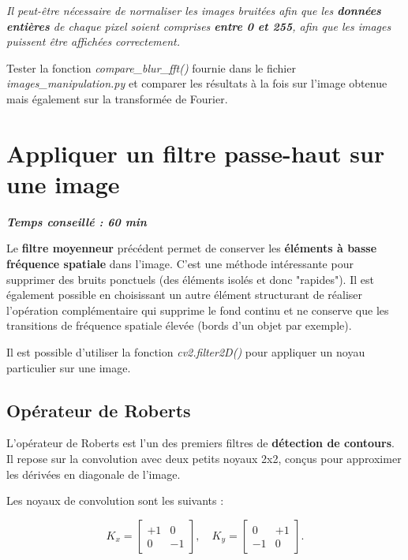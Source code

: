 \documentclass[a4paper,11pt,titlepage]{article} %
\begin{document}
\medskip

\textit{Il peut-être nécessaire de normaliser les images bruitées afin que les \textbf{données entières} de chaque pixel soient comprises \textbf{entre 0 et 255}, afin que les images puissent être affichées correctement.} 

\Manip Tester la fonction \textsl{compare\_blur\_fft()} fournie dans le fichier \textsl{images\_manipulation.py} et comparer les résultats à la fois sur l'image obtenue mais également sur la transformée de Fourier.


\section{Appliquer un filtre passe-haut sur une image}

\begin{center} \textbf{\textit{Temps conseillé : 60 min}} \end{center}

Le \textbf{filtre moyenneur} précédent permet de conserver les \textbf{éléments à basse fréquence spatiale} dans l'image. C'est une méthode intéressante pour supprimer des bruits ponctuels (des éléments isolés et donc "rapides"). Il est également possible en choisissant un autre élément structurant de réaliser l'opération complémentaire qui supprime le fond continu et ne conserve que les transitions de fréquence spatiale élevée (bords d'un objet par exemple).

\medskip

Il est possible d'utiliser la fonction \textsl{cv2.filter2D()} pour appliquer un noyau particulier sur une image.

\subsection{Opérateur de Roberts}

L'opérateur de Roberts est l'un des premiers filtres de \textbf{détection de contours}. Il repose sur la convolution avec deux petits noyaux 2x2, conçus pour approximer les dérivées en diagonale de l'image.

Les noyaux de convolution sont les suivants :

$$K_x = \begin{bmatrix}
+1 & 0 \\
0 & -1
\end{bmatrix},
\quad
K_y =
\begin{bmatrix}
0 & +1 \\
-1 & 0
\end{bmatrix}.
$$
\end{document}
